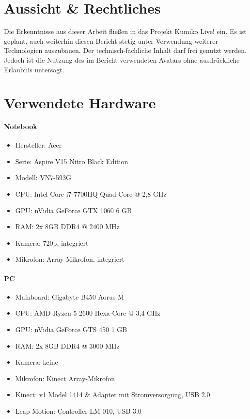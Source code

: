 \documentclass[a4paper, 12pt]{article}
\begin{document}
\section{Aussicht \& Rechtliches}
\label{sec:later}
Die Erkenntnisse aus dieser Arbeit fließen in das Projekt \glqq{}Kumiko Live!\grqq{}\cite{kumiko-live} ein.
Es ist geplant, auch weiterhin diesen Bericht stetig unter Verwendung weiterer Technologien auszubauen.
Der technisch-fachliche Inhalt darf frei genutzt werden.
Jedoch ist die Nutzung des im Bericht verwendeten Avatars ohne ausdrückliche Erlaubnis untersagt.
\newpage

\section{Verwendete Hardware}
\label{sec:hardware}
\paragraph{Notebook}
\begin{itemize}
    \item Hersteller: {\ttfamily Acer}
    \item Serie: {\ttfamily Aspire V15 Nitro Black Edition}
    \item Modell: {\ttfamily VN7-593G}
    \item CPU: {\ttfamily Intel Core i7-7700HQ Quad-Core @ 2,8 GHz}
    \item GPU: {\ttfamily nVidia GeForce GTX 1060 6 GB}
    \item RAM: {\ttfamily 2x 8GB DDR4 @ 2400 MHz}
    \item Kamera: {\ttfamily 720p, integriert}
    \item Mikrofon: {\ttfamily Array-Mikrofon, integriert}
\end{itemize}
\paragraph{PC}
\begin{itemize}
    \item Mainboard: {\ttfamily Gigabyte B450 Aorus M}
    \item CPU: {\ttfamily AMD Ryzen 5 2600 Hexa-Core @ 3,4 GHz}
    \item GPU: {\ttfamily nVidia GeForce GTS 450 1 GB}
    \item RAM: {\ttfamily 2x 8GB DDR4 @ 3000 MHz}
    \item Kamera: {\ttfamily keine}
    \item Mikrofon: {\ttfamily Kinect Array-Mikrofon}
    \item Kinect: {\ttfamily v1 Model 1414} \& {\ttfamily Adapter mit Stromversorgung, USB 2.0}
    \item Leap Motion: {\ttfamily Controller LM-010, USB 3.0}
\end{itemize}

\clearpage
\printbibliography[heading=bibintoc]
\end{document}
